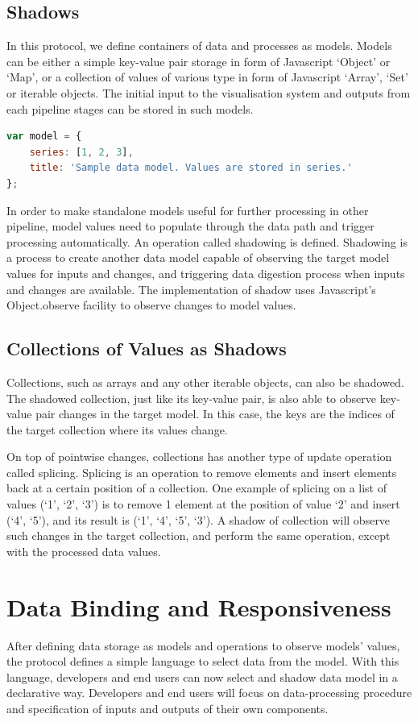 \documentclass[11pt, a4paper]{report}
\begin{document}
\subsection{Shadows}
In this protocol, we define containers of data and processes as models. Models can be either a simple key-value pair storage in form of Javascript `Object' or `Map', or a collection of values of various type in form of Javascript `Array', `Set' or iterable objects. The initial input to the visualisation system and outputs from each pipeline stages can be stored in such models.
\begin{lstlisting}[language=javascript]
var model = {
	series: [1, 2, 3],
	title: 'Sample data model. Values are stored in series.'
};
\end{lstlisting}
In order to make standalone models useful for further processing in other pipeline, model values need to populate through the data path and trigger processing automatically. An operation called shadowing is defined. Shadowing is a process to create another data model capable of observing the target model values for inputs and changes, and triggering data digestion process when inputs and changes are available. The implementation of shadow uses Javascript's Object.observe facility to observe changes to model values.

\subsection{Collections of Values as Shadows}
Collections, such as arrays and any other iterable objects, can also be shadowed. The shadowed collection, just like its key-value pair, is also able to observe key-value pair changes in the target model. In this case, the keys are the indices of the target collection where its values change.

On top of pointwise changes, collections has another type of update operation called splicing. Splicing is an operation to remove elements and insert elements back at a certain position of a collection. One example of splicing on a list of values (`1', `2', `3') is to remove 1 element at the position of value `2' and insert (`4', `5'), and its result is (`1', `4', `5', `3'). A shadow of collection will observe such changes in the target collection, and perform the same operation, except with the processed data values.
\section{Data Binding and Responsiveness}
After defining data storage as models and operations to observe models' values, the protocol defines a simple language to select data from the model. With this language, developers and end users can now select and shadow data model in a declarative way. Developers and end users will focus on data-processing procedure and specification of inputs and outputs of their own components.
\end{document}
